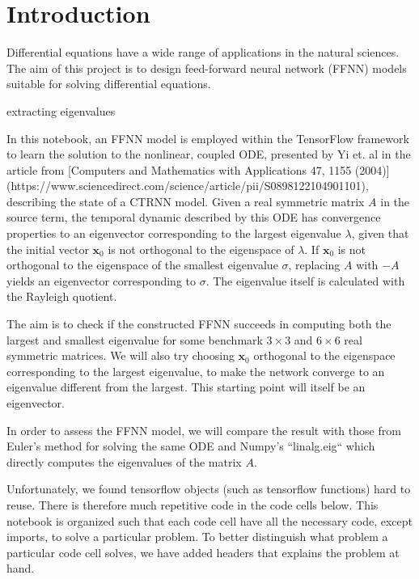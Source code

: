 \section{Introduction}\label{sec:Introduction}

Differential equations have a wide range of applications in the natural sciences. The aim of this project is to design feed-forward neural network (FFNN) models suitable for solving differential equations. 

extracting eigenvalues




In this notebook, an FFNN model is employed within the TensorFlow framework to learn the solution to the nonlinear, coupled ODE, presented by Yi et. al in the article from [Computers and Mathematics with Applications 47, 1155 (2004)](https://www.sciencedirect.com/science/article/pii/S0898122104901101), describing the state of a CTRNN model. Given a real symmetric matrix $A$ in the source term, the temporal dynamic described by this ODE has convergence properties to an eigenvector corresponding to the largest eigenvalue $\lambda$, given that the initial vector $\mathbf{x}_0$ is not orthogonal to the eigenspace of $\lambda$. If $\mathbf{x}_0$ is not orthogonal to the eigenspace of the smallest eigenvalue $\sigma$, replacing $A$ with $-A$ yields an eigenvector corresponding to $\sigma$. The eigenvalue itself is calculated with the Rayleigh quotient.

The aim is to check if the constructed FFNN succeeds in computing both the largest and smallest eigenvalue for some benchmark $3\times 3$ and $6\times 6$ real symmetric matrices. We will also try choosing $\mathbf{x}_0$ orthogonal to the eigenspace corresponding to the largest eigenvalue, to make the network converge to an eigenvalue different from the largest. This starting point will itself be an eigenvector.

In order to assess the FFNN model, we will compare the result with those from Euler's method for solving the same ODE and Numpy's ``linalg.eig`` which directly computes the eigenvalues of the matrix $A$. 

Unfortunately, we found tensorflow objects (such as tensorflow functions) hard to reuse. There is therefore much repetitive code in the code cells below. This notebook is organized such that each code cell have all the necessary code, except imports, to solve a particular problem. To better distinguish what problem a particular code cell solves, we have added headers that explains the problem at hand.

